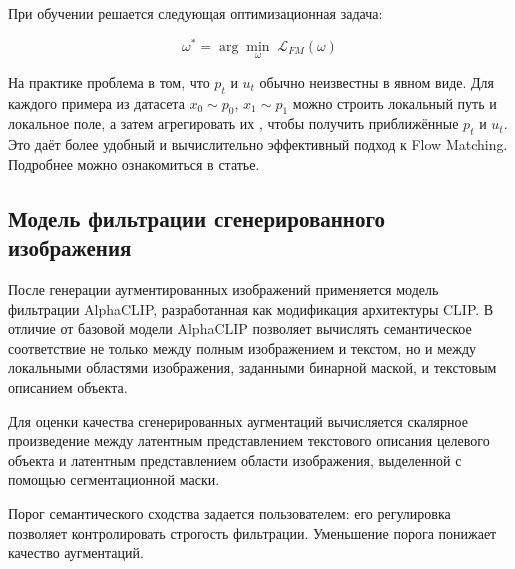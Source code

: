 При обучении решается следующая оптимизационная задача:

\[
\omega^* = \arg\min_{\omega}\;\mathcal{L}_{FM}(\omega)
\]


На практике проблема в том, что \(p_t\) и \(u_t\) обычно неизвестны в явном виде. Для каждого примера из датасета \(x_0\!\sim p_0\), \(x_1\!\sim p_1\) можно строить локальный путь и локальное поле, а затем агрегировать их , чтобы получить приближённые \(p_t\) и \(u_t\). Это даёт более удобный и вычислительно эффективный подход к Flow Matching. Подробнее можно ознакомиться в статье\cite{lipman2023flowmatchinggenerativemodeling}.


\subsection{Модель фильтрации сгенерированного изображения}
После генерации аугментированных изображений применяется модель фильтрации AlphaCLIP\cite{sun2023alphaclipclipmodelfocusing}, разработанная как модификация архитектуры CLIP\cite{DBLP:journals/corr/abs-2103-00020}. В отличие от базовой модели AlphaCLIP позволяет вычислять семантическое соответствие не только между полным изображением и текстом, но и между локальными областями изображения, заданными бинарной маской, и текстовым описанием объекта.

Для оценки качества сгенерированных аугментаций вычисляется скалярное произведение между латентным представлением текстового описания целевого объекта и латентным представлением области изображения, выделенной с помощью сегментационной маски.

Порог семантического сходства задается пользователем: его регулировка позволяет контролировать строгость фильтрации. Уменьшение порога понижает качество аугментаций.

